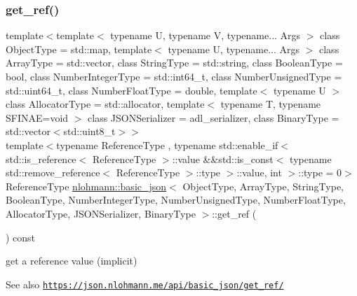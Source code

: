 \subsubsection{\texorpdfstring{get\+\_\+ref()}{get\_ref()}\hspace{0.1cm}{\footnotesize\ttfamily [2/2]}}
{\footnotesize\ttfamily template$<$template$<$ typename U, typename V, typename... Args $>$ class Object\+Type = std\+::map, template$<$ typename U, typename... Args $>$ class Array\+Type = std\+::vector, class String\+Type  = std\+::string, class Boolean\+Type  = bool, class Number\+Integer\+Type  = std\+::int64\+\_\+t, class Number\+Unsigned\+Type  = std\+::uint64\+\_\+t, class Number\+Float\+Type  = double, template$<$ typename U $>$ class Allocator\+Type = std\+::allocator, template$<$ typename T, typename S\+F\+I\+N\+A\+E=void $>$ class J\+S\+O\+N\+Serializer = adl\+\_\+serializer, class Binary\+Type  = std\+::vector$<$std\+::uint8\+\_\+t$>$$>$ \\
template$<$typename Reference\+Type , typename std\+::enable\+\_\+if$<$ std\+::is\+\_\+reference$<$ Reference\+Type $>$\+::value \&\&std\+::is\+\_\+const$<$ typename std\+::remove\+\_\+reference$<$ Reference\+Type $>$\+::type $>$\+::value, int $>$\+::type  = 0$>$ \\
Reference\+Type \hyperlink{classnlohmann_1_1basic__json}{nlohmann\+::basic\+\_\+json}$<$ Object\+Type, Array\+Type, String\+Type, Boolean\+Type, Number\+Integer\+Type, Number\+Unsigned\+Type, Number\+Float\+Type, Allocator\+Type, J\+S\+O\+N\+Serializer, Binary\+Type $>$\+::get\+\_\+ref (\begin{DoxyParamCaption}{ }\end{DoxyParamCaption}) const\hspace{0.3cm}{\ttfamily [inline]}}



get a reference value (implicit) 

\begin{DoxySeeAlso}{See also}
\href{https://json.nlohmann.me/api/basic_json/get_ref/}{\tt https\+://json.\+nlohmann.\+me/api/basic\+\_\+json/get\+\_\+ref/} 
\end{DoxySeeAlso}
\mbox{\label{classnlohmann_1_1basic__json_a95c3851acd53eccd620b0d82855c3da1}} 
